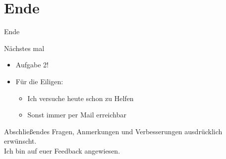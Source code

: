 
  \section{Ende}
  \begin{frame} {Ende}
    \begin{block} {Nächstes mal}
      \begin{itemize}
        \item Aufgabe 2!
        \item Für die Eiligen:
        \begin{itemize}
          \item Ich versuche heute schon zu Helfen
          \item Sonst immer per Mail erreichbar
        \end{itemize}
      \end{itemize}
    \end{block}
    \begin{exampleblock}{Abschließendes}
      Fragen, Anmerkungen und Verbesserungen ausdrücklich erwünscht.\\
      Ich bin auf euer Feedback angewiesen.
    \end{exampleblock}
  \end{frame}

